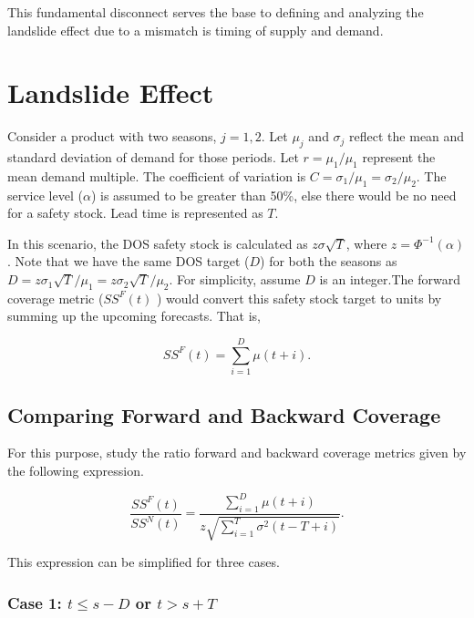\documentclass[,msom,nonblindrev]{informs}
\begin{document}
This fundamental disconnect serves the base to defining and analyzing
the landslide effect due to a mismatch is timing of supply and demand.

\hypertarget{landslide-effect}{%
\section{Landslide Effect}\label{landslide-effect}}

Consider a product with two seasons, \(j = 1, 2\). Let \(\mu_j\) and
\(\sigma_j\) reflect the mean and standard deviation of demand for those
periods. Let \(r = \mu_1/\mu_1\) represent the mean demand multiple. The
coefficient of variation is \(C = \sigma_1/\mu_1 = \sigma_2/\mu_2\). The
service level (\(\alpha\)) is assumed to be greater than 50\%, else
there would be no need for a safety stock. Lead time is represented as
\(T\).

In this scenario, the DOS safety stock is calculated as
\(z\sigma\sqrt{T}\), where \(z = \Phi^{-1}(\alpha)\). Note that we have
the same DOS target (\(D\)) for both the seasons as
\(D = z\sigma_1\sqrt{T}/\mu_1 = z\sigma_2\sqrt{T}/\mu_2\). For
simplicity, assume \(D\) is an integer.The forward coverage metric
(\(SS^F(t)\) ) would convert this safety stock target to units by
summing up the upcoming forecasts. That is,

\[
SS^F(t) = \sum_{i = 1}^D \mu(t+i).
\]

\hypertarget{comparing-forward-and-backward-coverage}{%
\subsection{Comparing Forward and Backward
Coverage}\label{comparing-forward-and-backward-coverage}}

For this purpose, \citet{neale2014} study the ratio forward and backward
coverage metrics given by the following expression.

\[
\frac{SS^F(t)}{SS^N(t)} = \frac{\sum_{i = 1}^D \mu(t + i)}{z \sqrt{\sum_{i = 1}^T \sigma^2(t-T+i)}}.
\]

This expression can be simplified for three cases.

\hypertarget{case-1-t-leq-s-d-or-tst}{%
\subsubsection{\texorpdfstring{Case 1: \(t \leq s-D\) or
\(t>s+T\)}{Case 1: t \textbackslash leq s-D or t\textgreater s+T}}\label{case-1-t-leq-s-d-or-tst}}
\end{document}
